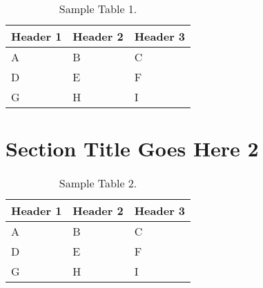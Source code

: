 \lipsum[12-15]

\begin{table}
\centering
\caption{Sample Table 1.}
\begin{tabular}{lll}
  \hline
  Header 1 & Header 2 & Header 3 \\ \hline
  A & B & C \\
  D & E & F \\
  G & H & I \\ \hline
\end{tabular}
\end{table}

\section{Section Title Goes Here 2}

\lipsum[15-25]

\begin{table}
\centering
\caption{Sample Table 2.}
\begin{tabular}{lll}
  \hline
  Header 1 & Header 2 & Header 3 \\ \hline
  A & B & C \\
  D & E & F \\
  G & H & I \\ \hline
\end{tabular}
\end{table}